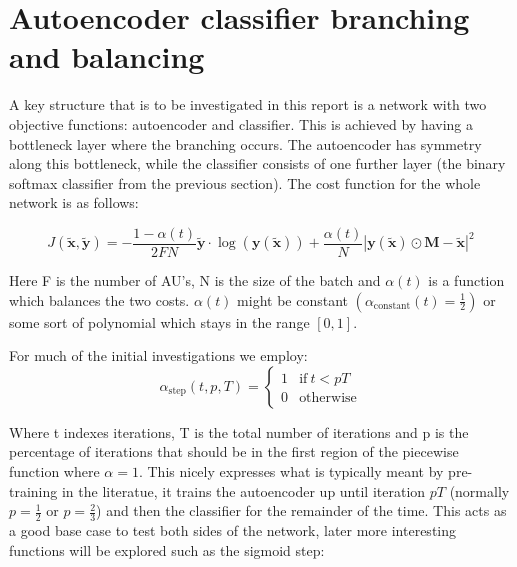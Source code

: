   \section{Autoencoder classifier branching and balancing} \label{sec:autoalpha}
    A key structure that is to be investigated in this report is a network with two objective functions:
    autoencoder and classifier. This is achieved by having a bottleneck layer where the branching occurs.
    The autoencoder has symmetry along this bottleneck, while the classifier consists of one further layer
    (the binary softmax classifier from the previous section). The cost function for the whole network is as follows:

    \begin{equation}
        J(\tilde{\mathbf{x}},\tilde{\mathbf{y}}) = -\frac{1-\alpha(t)}{2FN}\tilde{\mathbf{y}}\cdot\log(\mathbf{y}(\tilde{\mathbf{x}}))
        + \frac{\alpha(t)}{N}\left |\mathbf{y}(\tilde{\mathbf{x}}) \odot \mathbf{M}-\tilde{\mathbf{x}}\right | ^2
    \end{equation}

    Here F is the number of AU's, N is the size of the batch and $\alpha(t)$ is a
    function which balances the two costs. $\alpha(t)$ might be constant $\left ( \alpha_{\text{constant}}(t)=\frac{1}{2} \right )$ or
    some sort of polynomial which stays in the range $[0,1]$.

    For much of the initial investigations we employ:
    \begin{equation}
    \alpha_{\text{step}}(t,p,T) =
    \begin{cases}
      1           & \text{if}\ t<pT \\
      0           & \text{otherwise}
    \end{cases}
    \end{equation}

    Where t indexes iterations, T is the total number of iterations and p is the
    percentage of iterations that should be in the first region of the piecewise function
    where $\alpha=1$.
    This nicely expresses what is typically meant by pre-training in the literatue, it trains
    the autoencoder up until iteration $pT$ (normally $p=\frac{1}{2}$ or $p=\frac{2}{3}$) and then the classifier for the remainder of the time.
    This acts as a good base case to test both sides of the network, later more interesting
    functions will be explored such as the sigmoid step:

